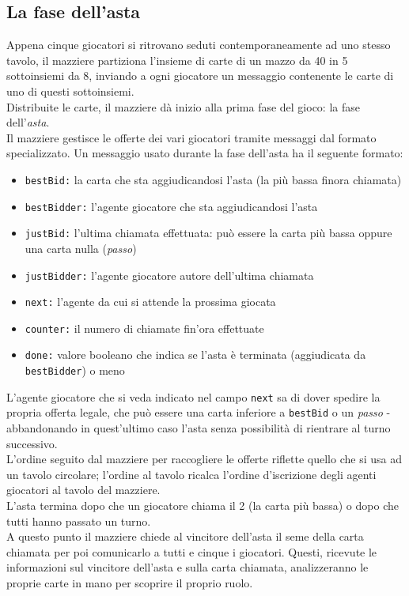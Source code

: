 \subsection{La fase dell'asta}
Appena cinque giocatori si ritrovano seduti contemporaneamente ad uno stesso tavolo, il mazziere partiziona l'insieme di carte di un mazzo da 40 in 5 sottoinsiemi da 8, inviando a ogni giocatore un messaggio contenente le carte di uno di questi sottoinsiemi.\\
Distribuite le carte, il mazziere dà inizio alla prima fase del gioco: la fase dell'\emph{asta}.\\
Il mazziere gestisce le offerte dei vari giocatori tramite messaggi dal formato specializzato. 
Un messaggio usato durante la fase dell'asta ha il seguente formato:
\begin{itemize}
   \item \texttt{bestBid:}  la carta che sta aggiudicandosi l'asta (la più bassa finora chiamata)
   \item \texttt{bestBidder:} l'agente giocatore che sta aggiudicandosi l'asta
   \item \texttt{justBid:}  l'ultima chiamata effettuata: può essere la carta più bassa oppure una carta nulla (\emph{passo})
   \item \texttt{justBidder:} l'agente giocatore autore dell'ultima chiamata
   \item \texttt{next:}  l'agente da cui si attende la prossima giocata
   \item \texttt{counter:}  il numero di chiamate fin'ora effettuate
   \item \texttt{done:}  valore booleano che indica se l'asta è terminata (aggiudicata da \texttt{bestBidder}) o meno
\end{itemize}
L'agente giocatore che si veda indicato nel campo \texttt{next} sa di dover spedire la propria offerta legale, che può essere una carta inferiore a \texttt{bestBid} o un \emph{passo} - abbandonando in quest'ultimo caso l'asta senza possibilità di rientrare al turno successivo.\\
L'ordine seguito dal mazziere per raccogliere le offerte riflette quello che si usa ad un tavolo circolare; l'ordine al tavolo ricalca l'ordine d'iscrizione degli agenti giocatori al tavolo del mazziere.\\
L'asta termina dopo che un giocatore chiama il 2 (la carta più bassa) o dopo che tutti hanno passato un turno.\\
A questo punto il mazziere chiede al vincitore dell'asta il seme della carta chiamata per poi comunicarlo a tutti e cinque i giocatori.
Questi, ricevute le informazioni sul vincitore dell'asta e sulla carta chiamata, analizzeranno le proprie carte in mano per scoprire il proprio ruolo.

